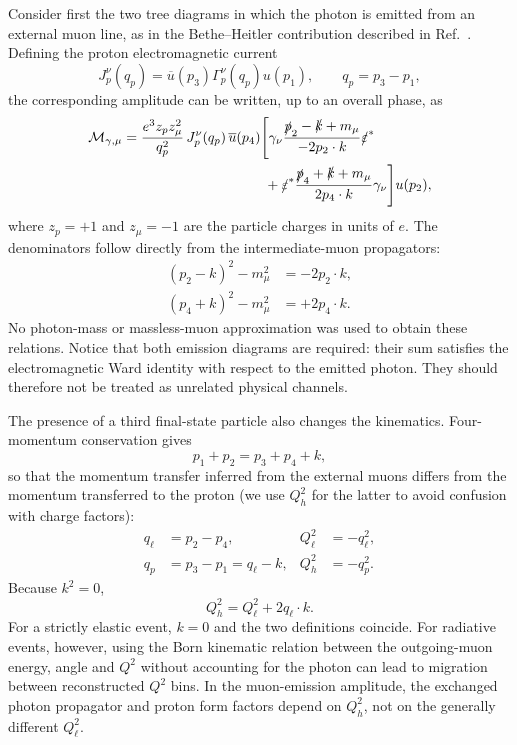 Consider first the two tree diagrams in which the photon is emitted from
an external muon line, as in the Bethe--Heitler contribution described in
Ref.~\cite{Vanderhaeghen2000}. Defining the proton electromagnetic current
\begin{equation}
  J_p^\nu(q_p)=\overline u(p_3)\Gamma_p^\nu(q_p)u(p_1),
  \qquad q_p=p_3-p_1,
\end{equation}
the corresponding amplitude can be written, up to an overall phase, as
\begin{align}
 \mathcal M_{\gamma,\mu}={}&
 \frac{e^3 z_p z_\mu^2}{q_p^2}\,J_p^\nu(q_p)\,
 \overline u(p_4)\Bigg[
 \gamma_\nu
  \frac{\slashed p_2-\slashed k+m_\mu}{-2p_2\cdot k}
  \slashed\varepsilon^* \nonumber\\
 &\hspace{31mm}
 +\slashed\varepsilon^*
   \frac{\slashed p_4+\slashed k+m_\mu}{2p_4\cdot k}
   \gamma_\nu\Bigg]u(p_2),
 \label{eq:nlo_mu_brems}
\end{align}
where $z_p=+1$ and $z_\mu=-1$ are the particle charges in units of $e$. The denominators follow directly
from the intermediate-muon propagators:
\begin{align}
 (p_2-k)^2-m_\mu^2&=-2p_2\cdot k,\\
 (p_4+k)^2-m_\mu^2&=+2p_4\cdot k.
 \label{eq:nlo_brems_denominators}
\end{align}
No photon-mass or massless-muon approximation was used to obtain these
relations. Notice that both emission diagrams are required: their sum
satisfies the electromagnetic Ward identity with respect to the emitted
photon. They should therefore not be treated as unrelated physical channels.

The presence of a third final-state particle also changes the kinematics.
Four-momentum conservation gives
\begin{equation}
 p_1+p_2=p_3+p_4+k,
\end{equation}
so that the momentum transfer inferred from the external muons differs
from the momentum transferred to the proton (we use $Q_h^2$ for the latter
to avoid confusion with charge factors):
\begin{align}
 q_\ell&=p_2-p_4, & Q_\ell^2&=-q_\ell^2,\\
 q_p&=p_3-p_1=q_\ell-k, &Q_h^2&=-q_p^2.
\end{align}
Because $k^2=0$,
\begin{equation}
 Q_h^2=Q_\ell^2+2q_\ell\cdot k.
 \label{eq:nlo_two_Q2}
\end{equation}
For a strictly elastic event, $k=0$ and the two definitions coincide.
For radiative events, however, using the Born kinematic relation between the
outgoing-muon energy, angle and $Q^2$ without accounting for the photon can
lead to migration between reconstructed $Q^2$ bins. In the muon-emission
amplitude, the exchanged photon propagator and proton form factors depend
on $Q_h^2$, not on the generally different $Q_\ell^2$.

